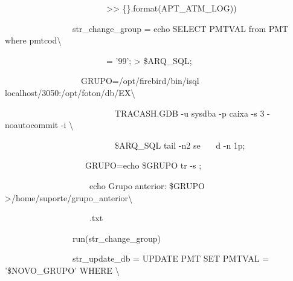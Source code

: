             {\ttfamily\color[rgb]{0.10980392,0.10980392,0.10980392}
            \ \ \ \ \ \ \ \ \ \ \ \ \ \ \ \ \ \ \ \ \ \ \ \ {\textgreater}{\textgreater}
            \{\}{\textquotedbl}{\textquotedbl}{\textquotedbl}.format(APT\_ATM\_LOG))}


    \bigskip

{\ttfamily\color[rgb]{0.10980392,0.10980392,0.10980392}
    \ \ \ \ \ \ \ \ \ \ \ \ \ \ \ \ str\_change\_group = {\textquotedbl}{\textquotedbl}{\textquotedbl}echo
    {\textquotedbl}SELECT PMTVAL from PMT where pmtcod{\textbackslash}}

{\ttfamily\color[rgb]{0.10980392,0.10980392,0.10980392}
    \ \ \ \ \ \ \ \ \ \ \ \ \ \ \ \ \ \ \ \ \ \ \ \ = '99';{\textquotedbl} {\textgreater} \$ARQ\_SQL;}

{\ttfamily\color[rgb]{0.10980392,0.10980392,0.10980392}
    \ \ \ \ \ \ \ \ \ \ \ \ \ \ \ \ \ \ GRUPO={\textasciigrave}/opt/firebird/bin/isql
        localhost/3050:/opt/foton/db/EX{\textbackslash}}

{\ttfamily\color[rgb]{0.10980392,0.10980392,0.10980392}
    \ \ \ \ \ \ \ \ \ \ \ \ \ \ \ \ \ \ \ \ \ \ \ \ \ \ TRACASH.GDB -u sysdba -p caixa -s 3 -noautocommit -i
    {\textbackslash}}

{\ttfamily\color[rgb]{0.10980392,0.10980392,0.10980392}
    \ \ \ \ \ \ \ \ \ \ \ \ \ \ \ \ \ \ \ \ \ \ \ \ \ \ \$ARQ\_SQL {\textbar} tail -n2 {\textbar} se \ \ \ d -n
        1p{\textasciigrave};}

{\ttfamily\color[rgb]{0.10980392,0.10980392,0.10980392}
    \ \ \ \ \ \ \ \ \ \ \ \ \ \ \ \ \ \ \ GRUPO={\textasciigrave}echo \$GRUPO {\textbar} tr -s {\textquotedbl}
    {\textquotedbl}{\textasciigrave};}

{\ttfamily\color[rgb]{0.10980392,0.10980392,0.10980392}
    \ \ \ \ \ \ \ \ \ \ \ \ \ \ \ \ \ \ \ \ echo {\textquotedbl}Grupo anterior: \$GRUPO{\textquotedbl}
    {\textgreater}/home/suporte/grupo\_anterior{\textbackslash}}

{\ttfamily\color[rgb]{0.10980392,0.10980392,0.10980392}
    \ \ \ \ \ \ \ \ \ \ \ \ \ \ \ \ \ \ \ \ .txt{\textquotedbl}{\textquotedbl}{\textquotedbl}}

{\ttfamily\color[rgb]{0.10980392,0.10980392,0.10980392}
    \ \ \ \ \ \ \ \ \ \ \ \ \ \ \ \ run(str\_change\_group)}


    \bigskip

{\ttfamily\color[rgb]{0.10980392,0.10980392,0.10980392}
    \ \ \ \ \ \ \ \ \ \ \ \ \ \ \ \ str\_update\_db = {\textquotedbl}UPDATE PMT SET PMTVAL = '\$NOVO\_GRUPO' WHERE
    {\textbackslash}}

